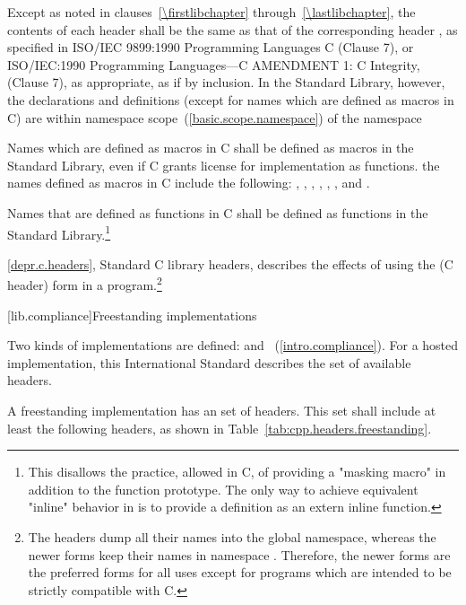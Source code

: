 \pnum
Except as noted in clauses~\ref{\firstlibchapter} through~\ref{\lastlibchapter},
the contents of each header  shall
be the same as that of the corresponding header , as
specified in ISO/IEC 9899:1990 Programming Languages C (Clause 7),
or ISO/IEC:1990 Programming Languages---C AMENDMENT 1: C Integrity, (Clause 7),
as appropriate, as if by inclusion. In the \Cpp Standard Library, however, the
declarations and definitions (except for names which are defined as macros in C) are within
namespace scope~(\ref{basic.scope.namespace}) of the namespace 

\pnum
Names which are defined as macros in C shall be defined as macros in the \Cpp
Standard Library, even if C grants license for implementation as functions.
\enternote the names defined as macros in C include the following:
, , , , ,
, and . \exitnoteb

\pnum
Names that are defined as functions in C shall be defined as functions in the
\Cpp Standard Library.\footnote{This disallows the practice, allowed in C, of
providing a "masking macro" in addition to the function prototype. The only way to
achieve equivalent "inline" behavior in \Cpp is to provide a definition as an
extern inline function.}

\pnum
\ref{depr.c.headers}, Standard C library headers, describes the effects of using
the  (C header) form in a \Cpp program.\footnote{ The
 headers dump all their names into the global namespace, whereas the
newer forms keep their names in namespace . Therefore, the newer
forms are the preferred forms for all uses except for \Cpp programs which are
intended to be strictly compatible with C. }

[lib.compliance]{Freestanding implementations}

\pnum
Two kinds of implementations are defined:
and
~(\ref{intro.compliance}).
For a hosted implementation, this International Standard
%
describes the set of available headers.

\pnum
A freestanding implementation has an
 set of headers. This set shall
include at least the following headers, as shown in Table~\ref{tab:cpp.headers.freestanding}.

